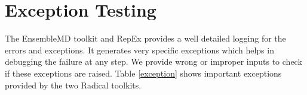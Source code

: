 \documentclass[10pt]{ruthesis}
\begin{document}

\section{Exception Testing}
The EnsembleMD toolkit and RepEx provides a well detailed logging for the errors and exceptions. It generates very specific exceptions which helps in debugging the failure at any step. We provide wrong or improper inputs to check if these exceptions are raised. Table \ref{exception} shows important exceptions provided by the two Radical toolkits.
\end{document}
